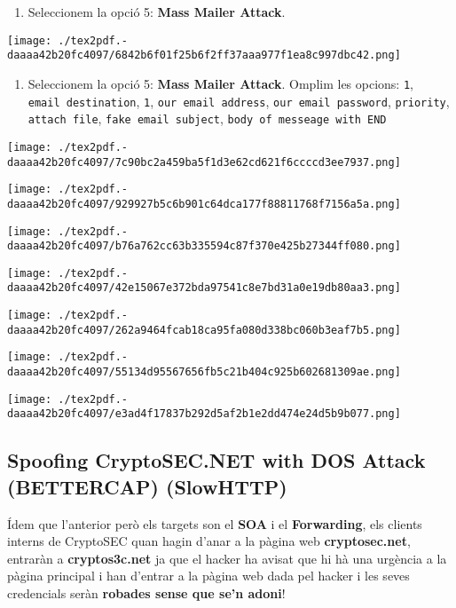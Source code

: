 \documentclass[]{article}
\providecommand{\tightlist}{%
  \setlength{\itemsep}{0pt}\setlength{\parskip}{0pt}}
\begin{document}
\begin{enumerate}
\def\labelenumi{\arabic{enumi}.}
\tightlist
\item
  Seleccionem la opció 5: \textbf{Mass Mailer Attack}.
\end{enumerate}

\texttt{[image: ./tex2pdf.-daaaa42b20fc4097/6842b6f01f25b6f2ff37aaa977f1ea8c997dbc42.png]}

\begin{enumerate}
\def\labelenumi{\arabic{enumi}.}
\setcounter{enumi}{1}
\tightlist
\item
  Seleccionem la opció 5: \textbf{Mass Mailer Attack}. Omplim les
  opcions: \texttt{1}, \texttt{email\ destination}, \texttt{1},
  \texttt{our\ email\ address}, \texttt{our\ email\ password},
  \texttt{priority}, \texttt{attach\ file},
  \texttt{fake\ email\ subject}, \texttt{body\ of\ messeage\ with\ END}
\end{enumerate}

\texttt{[image: ./tex2pdf.-daaaa42b20fc4097/7c90bc2a459ba5f1d3e62cd621f6ccccd3ee7937.png]}

\texttt{[image: ./tex2pdf.-daaaa42b20fc4097/929927b5c6b901c64dca177f88811768f7156a5a.png]}

\texttt{[image: ./tex2pdf.-daaaa42b20fc4097/b76a762cc63b335594c87f370e425b27344ff080.png]}

\texttt{[image: ./tex2pdf.-daaaa42b20fc4097/42e15067e372bda97541c8e7bd31a0e19db80aa3.png]}

\texttt{[image: ./tex2pdf.-daaaa42b20fc4097/262a9464fcab18ca95fa080d338bc060b3eaf7b5.png]}

\texttt{[image: ./tex2pdf.-daaaa42b20fc4097/55134d95567656fb5c21b404c925b602681309ae.png]}

\texttt{[image: ./tex2pdf.-daaaa42b20fc4097/e3ad4f17837b292d5af2b1e2dd474e24d5b9b077.png]}

\hypertarget{spoofing-cryptosec.net-with-dos-attack-bettercap-slowhttp}{%
\subsection{\texorpdfstring{\textbf{Spoofing CryptoSEC.NET with DOS
Attack (BETTERCAP)
(SlowHTTP)}}{Spoofing CryptoSEC.NET with DOS Attack (BETTERCAP) (SlowHTTP)}}\label{spoofing-cryptosec.net-with-dos-attack-bettercap-slowhttp}}

Ídem que l'anterior però els targets son el \textbf{SOA} i el
\textbf{Forwarding}, els clients interns de CryptoSEC quan hagin d'anar
a la pàgina web \textbf{cryptosec.net}, entraràn a
\textbf{cryptos3c.net} ja que el hacker ha avisat que hi hà una urgència
a la pàgina principal i han d'entrar a la pàgina web dada pel hacker i
les seves credencials seràn \textbf{robades sense que se'n adoni}!
\end{document}
